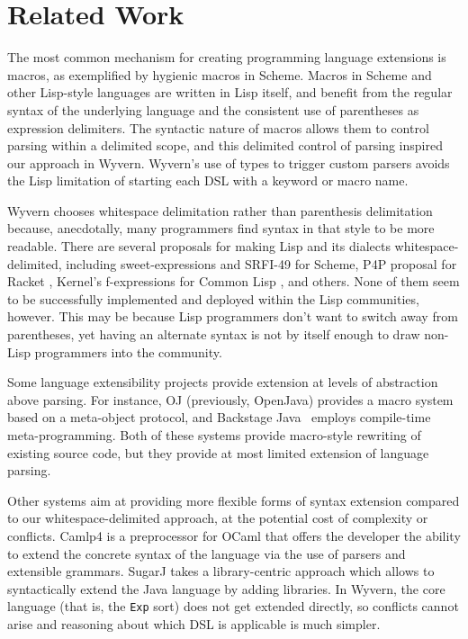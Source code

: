\section{Related Work}
\label{s:related}
The most common mechanism for creating programming language extensions is macros, as exemplified by hygienic macros in Scheme. Macros in Scheme and other Lisp-style languages are written in Lisp itself, and benefit from the regular syntax of the underlying language and the consistent use of parentheses as expression delimiters.  The syntactic nature of macros allows them to control parsing within a delimited scope, and this delimited control of parsing inspired our approach in Wyvern.  Wyvern's use of types to trigger custom parsers avoids the Lisp limitation of starting each DSL with a keyword or macro name.

Wyvern chooses whitespace delimitation rather than parenthesis delimitation because, anecdotally, many programmers find syntax in that style to be more readable.  There are several proposals for making Lisp and its dialects whitespace-delimited, including sweet-expressions \cite{sweet-expr} and SRFI-49 \cite{srfi-49} for Scheme, P4P proposal for Racket \cite{p4p-proposal}, Kernel's f-expressions \cite{fexprthesis} for Common Lisp \cite{f-expr}, and others. None of them seem to be successfully implemented and deployed within the Lisp communities, however.  This may be because Lisp programmers don't want to switch away from parentheses, yet having an alternate syntax is not by itself enough to draw non-Lisp programmers into the community.


Some language extensibility projects provide extension at levels of abstraction above parsing. For instance, OJ (previously, OpenJava)
\cite{Tatsubori00openjava:a} provides a macro system based on a meta-object
protocol, and Backstage Java~\cite{Palmer:2011:BJM:2048066.2048137} employs compile-time meta-programming.  Both of these systems provide macro-style rewriting of existing source code, but they provide at most limited extension of language parsing.

Other systems aim at providing more flexible forms of syntax extension compared to our whitespace-delimited approach, at the potential cost of complexity or conflicts.  Camlp4 \cite{camlp4} is a preprocessor for OCaml that offers the developer the ability to extend the concrete syntax of the language via the use of parsers and extensible grammars.  SugarJ \cite{Erdweg:2011:SLL:2048147.2048199} takes a library-centric approach which allows to syntactically extend the Java language by adding libraries. In Wyvern, the core language (that is, the \verb|Exp| sort) does not get extended directly, so conflicts cannot arise and reasoning about which DSL is applicable is much simpler.

